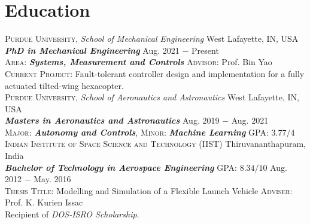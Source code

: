 \documentclass[letterpaper,10pt]{article}
\begin{document}
\section{Education}
\noindent \textsc{Purdue University}, \textit{School of Mechanical Engineering} \hfill West Lafayette, IN, USA \\
\textbf{\textit{PhD in Mechanical Engineering}} \hfill Aug. 2021 $-$ Present\\
\textsc{Area}: \textit{\textbf{Systems, Measurement and Controls}}  \hfill \textsc{Advisor}: Prof. Bin Yao\\
\textsc{Current Project}: Fault-tolerant controller design and implementation for a fully actuated tilted-wing hexacopter.\\

\vspace{5pt}
\noindent \textsc{Purdue University}, \textit{School of Aeronautics and Astronautics} \hfill West Lafayette, IN, USA \\
\textbf{\textit{Masters in Aeronautics and Astronautics}} \hfill Aug. 2019 $-$ Aug. 2021\\
\textsc{Major}: \textit{\textbf{Autonomy and Controls}}, \textsc{Minor}: \textit{\textbf{Machine Learning}}
\hfill \textsc{GPA}: $3.77/4$\\


\vspace{5pt}
\noindent \textsc{Indian Institute of Space Science and Technology (IIST)} \hfill Thiruvananthapuram, India\\
\textbf{\textit{Bachelor of Technology in Aerospace Engineering}} \hfill \textsc{GPA}: $8.34/10$ \hfill Aug. 2012 $-$ May. 2016 \\
\textsc{Thesis Title}: Modelling and Simulation of a Flexible Launch Vehicle
\hfill \textsc{Adviser}: Prof. K. Kurien Issac \\
Recipient of \textit{DOS-ISRO Scholarship}.
\end{document}
